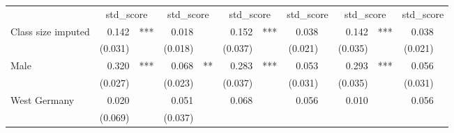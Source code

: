\documentclass{article}
\begin{document}
\begin{table}[!h]
\centering
\begin{tabular}{lllllllllllll}
\cline{1-13}
\multicolumn{1}{r}{} &
  \multicolumn{2}{c}{std\_score} &
  \multicolumn{2}{c}{std\_score} &
  \multicolumn{2}{c}{std\_score} &
  \multicolumn{2}{c}{std\_score} &
  \multicolumn{2}{c}{std\_score} &
  \multicolumn{2}{c}{std\_score} \\
\cline{1-13}
\multicolumn{1}{l}{Class size imputed} &
  \multicolumn{1}{r}{0.142} &
  \multicolumn{1}{l}{***} &
  \multicolumn{1}{r}{0.018} &
  \multicolumn{1}{l}{} &
  \multicolumn{1}{r}{0.152} &
  \multicolumn{1}{l}{***} &
  \multicolumn{1}{r}{0.038} &
  \multicolumn{1}{l}{} &
  \multicolumn{1}{r}{0.142} &
  \multicolumn{1}{l}{***} &
  \multicolumn{1}{r}{0.038} &
  \multicolumn{1}{l}{} \\
\multicolumn{1}{l}{} &
  \multicolumn{1}{r}{(0.031)} &
  \multicolumn{1}{l}{} &
  \multicolumn{1}{r}{(0.018)} &
  \multicolumn{1}{l}{} &
  \multicolumn{1}{r}{(0.037)} &
  \multicolumn{1}{l}{} &
  \multicolumn{1}{r}{(0.021)} &
  \multicolumn{1}{l}{} &
  \multicolumn{1}{r}{(0.035)} &
  \multicolumn{1}{l}{} &
  \multicolumn{1}{r}{(0.021)} &
  \multicolumn{1}{l}{} \\
\multicolumn{1}{l}{Male} &
  \multicolumn{1}{r}{0.320} &
  \multicolumn{1}{l}{***} &
  \multicolumn{1}{r}{0.068} &
  \multicolumn{1}{l}{**} &
  \multicolumn{1}{r}{0.283} &
  \multicolumn{1}{l}{***} &
  \multicolumn{1}{r}{0.053} &
  \multicolumn{1}{l}{} &
  \multicolumn{1}{r}{0.293} &
  \multicolumn{1}{l}{***} &
  \multicolumn{1}{r}{0.056} &
  \multicolumn{1}{l}{} \\
\multicolumn{1}{l}{} &
  \multicolumn{1}{r}{(0.027)} &
  \multicolumn{1}{l}{} &
  \multicolumn{1}{r}{(0.023)} &
  \multicolumn{1}{l}{} &
  \multicolumn{1}{r}{(0.037)} &
  \multicolumn{1}{l}{} &
  \multicolumn{1}{r}{(0.031)} &
  \multicolumn{1}{l}{} &
  \multicolumn{1}{r}{(0.035)} &
  \multicolumn{1}{l}{} &
  \multicolumn{1}{r}{(0.031)} &
  \multicolumn{1}{l}{} \\
\multicolumn{1}{l}{West Germany} &
  \multicolumn{1}{r}{0.020} &
  \multicolumn{1}{l}{} &
  \multicolumn{1}{r}{0.051} &
  \multicolumn{1}{l}{} &
  \multicolumn{1}{r}{0.068} &
  \multicolumn{1}{l}{} &
  \multicolumn{1}{r}{0.056} &
  \multicolumn{1}{l}{} &
  \multicolumn{1}{r}{0.010} &
  \multicolumn{1}{l}{} &
  \multicolumn{1}{r}{0.056} &
  \multicolumn{1}{l}{} \\
\multicolumn{1}{l}{} &
  \multicolumn{1}{r}{(0.069)} &
  \multicolumn{1}{l}{} &
  \multicolumn{1}{r}{(0.037)} &

\end{tabular}
\end{table}
\end{document}
